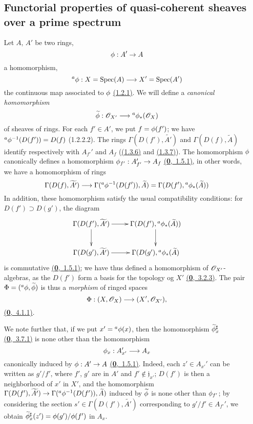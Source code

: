 \subsection{Functorial properties of quasi-coherent sheaves over a prime spectrum}
\label{subsection-func-prop-qcoh-over-spec}

\begin{env}[1.6.1]
\label{env-1.1.6.1}
Let $A$, $A'$ be two rings,
\[
  \phi:A'\to A
\]
a homomorphism,
\[
  {}^a\phi:X={\mathop{\mathrm{Spec}}\nolimits}(A)\longrightarrow X'={\mathop{\mathrm{Spec}}\nolimits}(A')
\]
the continuous map associated to $\phi$ \hyperref[env-1.1.2.1]{(1.2.1)}. We will define a {\it canonical
homomorphism}
\[
  \widetilde{\phi}:\mathscr{O}_{X'}\longrightarrow{}^a\phi_*(\mathscr{O}_X)
\]
of sheaves of rings. For each $f'\in A'$, we put $f=\phi(f')$; we have
${}^a\phi^{-1}(D(f'))=D(f)$ (1.2.2.2). The rings $\Gamma(D(f'),\widetilde{A'})$ and
$\Gamma(D(f),\widetilde{A})$ identify respectively with $A_{f'}'$ and $A_f$
(\hyperref[prop-1.1.3.6]{(1.3.6)} and \hyperref[thm-1.1.3.7]{(1.3.7)}). The homomorphism $\phi$ canonically defines a
homomorphism $\phi_{f'}:A_{f'}'\to A_f$ \hyperref[env-0.1.5.1]{(\textbf{0},~1.5.1)}, in other words, we have a
homomorphism of rings
\[
  \Gamma(D(f),\widetilde{A'})\longrightarrow\Gamma({}^a\phi^{-1}(D(f')),\widetilde{A})
  =\Gamma(D(f'),{}^a\phi_*(\widetilde{A}))
\]
In addition, these homomorphism satisfy the usual compatibility conditions: for
$D(f')\supset D(g')$, the diagram
\[
  \xymatrix{
    \Gamma(D(f'),\widetilde{A'})\ar[r]\ar[d] &
    \Gamma(D(f'),{}^a\vphi_*(\widetilde{A}))\ar[d]\\
    \Gamma(D(g'),\widetilde{A'})\ar[r] &
    \Gamma(D(g'),{}^a\vphi_*(\widetilde{A})
  }
\]
is commutative \hyperref[env-0.1.5.1]{(\textbf{0},~1.5.1)}; we have thus defined a homomorphism of $\mathscr{O}_{X'}$-algebras,
as the $D(f')$ form a basis for the topology og $X'$ \hyperref[env-0.3.2.3]{(\textbf{0},~3.2.3)}. The pair
$\Phi=({}^a\phi,\widetilde{\phi})$ is thus a {\it morphism} of ringed spaces
\[
  \Phi:(X,\mathscr{O}_X)\longrightarrow(X',\mathscr{O}_{X'}),
\]
\hyperref[env-0.4.1.1]{(\textbf{0},~4.1.1)}.

We note further that, if we put $x'={}^a\phi(x)$, then the homomorphism
$\widetilde{\phi}_x^\sharp$ \hyperref[env-0.3.7.1]{(\textbf{0},~3.7.1)} is none other than the homomorphism
\[
  \phi_x:A_{x'}'\longrightarrow A_x
\]
canonically induced by $\phi:A'\to A$ \hyperref[env-0.1.5.1]{(\textbf{0},~1.5.1)}. Indeed, each $z'\in A_{x'}'$
can be written as $g'/f'$, where $f'$, $g'$ are in $A'$ and $f'\not\in\mathfrak{j}_{x'}$;
$D(f')$ is then a neighborhood of $x'$ in $X'$, and the homomorphism
$\Gamma(D(f'),\widetilde{A'})\to\Gamma({}^a\phi^{-1}(D(f')),\widetilde{A})$ induced by
$\widetilde{\phi}$ is none other than $\phi_{f'}$; by considering the section
$s'\in\Gamma(D(f'),\widetilde{A'})$ corresponding to $g'/f'\in A_{f'}'$, we obtain
$\widetilde{\phi}_x^\sharp(z')=\phi(g')/\phi(f')$ in $A_x$.
\end{env}

